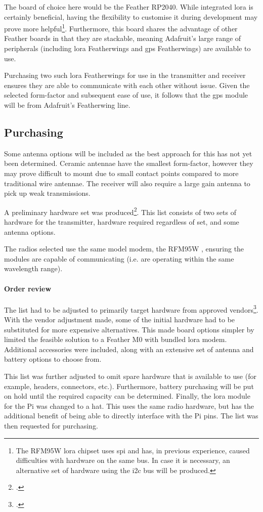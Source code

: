 The board of choice here would be the Feather RP2040. While integrated \gls{lora} 
is certainly beneficial, having the flexibility to customise it during development 
may prove more helpful\footnote{
    The RFM95W \gls{lora} chipset uses \acrshort{spi} and has, in previous experience,
caused difficulties with hardware on the same bus. In case it is necessary, an alternative set
of hardware using the \acrshort{i2c} bus will be produced.
}. Furthermore, this board shares the advantage of other Feather 
boards in that they are stackable, meaning Adafruit's large range of peripherals 
(including \gls{lora} Featherwings and \acrshort{gps} Featherwings) are available to use. 

Purchasing two such \gls{lora} Featherwings for use in the transmitter and receiver 
ensures they are able to communicate with each other without issue. Given the selected 
form-factor and subsequent ease of use, it follows that the \acrshort{gps} module will be 
from Adafruit's Featherwing line. 

\subsection{Purchasing}

Some antenna options will be included as the best approach 
for this has not yet been determined. Ceramic antennae have the smallest form-factor,
however they may prove difficult to mount due to small contact points compared to more traditional 
wire antennae. The receiver will also require a large gain antenna to pick up weak transmissions.

A preliminary hardware set was produced\footnote{
    .
}. This list consists 
of two sets of hardware for the transmitter, hardware required regardless of set, and some antenna 
options. 

The radios selected use the same model modem, the RFM95W \cite{hoperf:rfm95w}, 
ensuring the modules are capable of communicating (i.e. are operating within the 
same wavelength range).

\paragraph{Order review}
The list had to be adjusted to primarily target hardware from approved vendors\footnote{
    .
}. 
With the vendor adjustment made, some of the initial hardware had to be substituted for 
more expensive alternatives. This made board options simpler by limited the feasible solution
to a Feather M0 with bundled \gls{lora} modem. Additional accessories were included, along with 
an extensive set of antenna and battery options to choose from. 

This list was further adjusted to omit spare hardware that is available to use (for example, 
headers, connectors, etc.). Furthermore, battery purchasing will be put on hold until 
the required capacity can be determined. Finally, the \gls{lora} module for the Pi was 
changed to a \acrshort{hat}. This uses the same radio hardware, but has the additional benefit 
of being able to directly interface with the Pi pins. 
The list was then requested for purchasing. 


